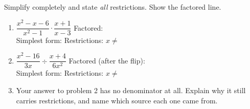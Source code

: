 \documentclass[10pt]{article}
\begin{document}
\begin{practicebox}
Simplify completely and state \emph{all} restrictions. Show the factored line.

\vspace{3pt}
\begin{enumerate}[leftmargin=1.7em, itemsep=8pt]
  \item $\dfrac{x^2-x-6}{x^2-1}\cdot\dfrac{x+1}{x-3}$ \hfill Factored: \blank{4.4cm} \\[4pt]
        Simplest form: \blank{2.4cm} \quad Restrictions: $x\neq$ \blank{2.4cm}
  \item $\dfrac{x^2-16}{3x}\div\dfrac{x+4}{6x^2}$ \hfill Factored (after the flip): \blank{4.4cm} \\[4pt]
        Simplest form: \blank{2.4cm} \quad Restrictions: $x\neq$ \blank{2.4cm}
  \item Your answer to problem 2 has no denominator at all. Explain why it still carries restrictions,
        and name which source each one came from. 
\end{enumerate}
\end{practicebox}
\end{document}
